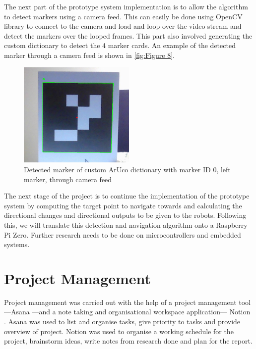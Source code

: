 \documentclass[12pt,a4paper]{report}
\def\aruco{ArUco }
\begin{document}
The next part of the prototype system implementation is to allow the algorithm to detect markers using a camera feed. This can easily be done using OpenCV library to connect to the camera and load and loop over the video stream and detect the markers over the looped frames.  This part also involved generating the custom dictionary to detect the 4 marker cards. An example of the detected marker through a camera feed is shown in \autoref{fig:Figure 8}.

\begin{figure}[ht]
    \centering
    \includegraphics[width=0.5\textwidth]{Images/left marker detection test.png}
    \caption[Detected marker of custom \aruco dictionary]{Detected marker of custom \aruco dictionary with marker ID 0, left marker, through camera feed}
    \label{fig:Figure 8}
\end{figure}

The next stage of the project is to continue the implementation of the prototype system by computing the target point to navigate towards and calculating the directional changes and directional outputs to be given to the robots. Following this, we will translate this detection and navigation algorithm onto a Raspberry Pi Zero. Further research needs to be done on microcontrollers and embedded systems.

\chapter{Project Management}
\label{Chapter: Project Management}
Project management was carried out with the help of a project management tool---Asana \cite{asana}---and a note taking and organisational workspace application--- Notion \cite{notion}. Asana was used to list and organise tasks, give priority to tasks and provide overview of project. Notion was used to organise a working schedule for the project, brainstorm ideas, write notes from research done and plan for the report.
\end{document}
